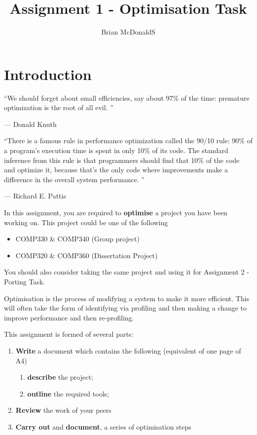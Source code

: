 \documentclass{../../fal_assignment}
\title{Assignment 1 - Optimisation Task}
\author{Brian McDonaldS}
\begin{document}
\maketitle

%

\section*{Introduction}

\begin{marginquote}
``We should forget about small efficiencies, say about 97\% of the time: premature optimization is the root of all evil. ''

--- Donald Knuth

    \marginquoterule

``There is a famous rule in performance optimization called the 90/10 rule: 90\% of a program's execution time is spent in only 10\% of its code. The standard inference from this rule is that programmers should find that 10\% of the code and optimize it, because that's the only code where improvements make a difference in the overall system performance. ''

--- Richard E. Pattis
\end{marginquote}


In this assignment, you are required to \textbf{optimise} a project you have been working on. This project could be one of the following
\begin{itemize}
	\item COMP330 \& COMP340 (Group project)
	\item COMP320 \& COMP360 (Dissertation Project)
\end{itemize}

You should also consider taking the same project and using it for Assignment 2 - Porting Task.

Optimisation is the process of modifying a system to make it more efficient. This will often take the form of identifying via profiling and then making a change to improve performance and then re-profiling. 

This assignment is formed of several parts:
\begin{enumerate}[label=(\Alph*)]
	\item \textbf{Write} a document which contains the following (equivalent of one page of A4)
		\begin{enumerate}[label=(\roman*)]
			\item \textbf{describe} the project;
			\item \textbf{outline} the required tools;
		\end{enumerate}
	\item \textbf{Review} the work of your peers
	\item \textbf{Carry out} and \textbf{document}, a series of optimisation steps
\end{enumerate}
\end{document}
